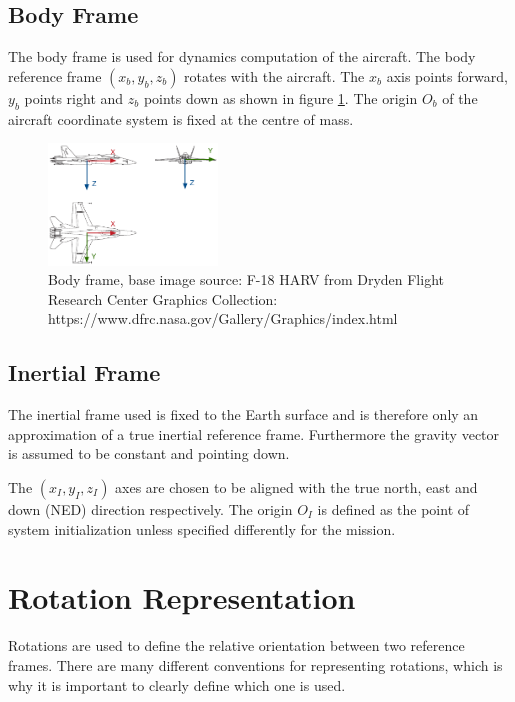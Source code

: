 \documentclass[a4paper]{paper}
\begin{document}
\subsection{Body Frame}

The body frame is used for dynamics computation of the aircraft.
The body reference frame $(x_b, y_b, z_b)$ rotates with the aircraft.
The $x_b$ axis points forward, $y_b$ points right and $z_b$ points down as shown in figure \ref{fig:body_frame}.
The origin $O_b$ of the aircraft coordinate system is fixed at the centre of mass.

\begin{figure}[h]
\centering
\includegraphics[width=0.4\textwidth]{img/body_frame.pdf}
\caption{Body frame, base image source: F-18 HARV from Dryden Flight Research Center Graphics Collection: https://www.dfrc.nasa.gov/Gallery/Graphics/index.html}
\label{fig:body_frame}
\end{figure}

\subsection{Inertial Frame}

The inertial frame used is fixed to the Earth surface and is therefore only an approximation of a true inertial reference frame.
Furthermore the gravity vector is assumed to be constant and pointing down.

The $(x_I, y_I, z_I)$ axes are chosen to be aligned with the true north, east and down (NED) direction respectively.
The origin $O_I$ is defined as the point of system initialization unless specified differently for the mission.



\section{Rotation Representation}

Rotations are used to define the relative orientation between two reference frames.
There are many different conventions for representing rotations, which is why it is important to clearly define which one is used.
\end{document}
